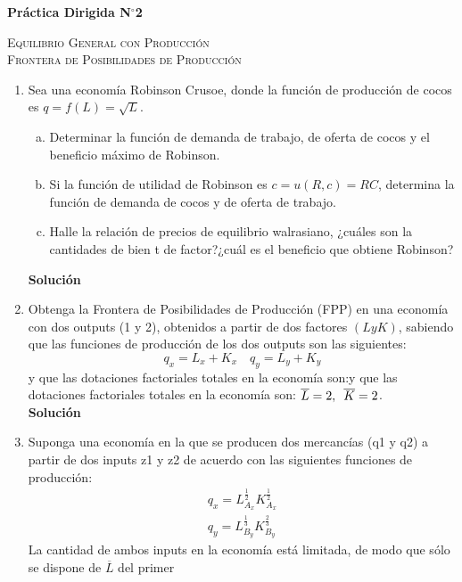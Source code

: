 \documentclass[10pt,a4paper]{article}
\begin{document}
	\begin{center}
		{\Large {\textbf{Práctica Dirigida N$^{\circ}$2}}}

		\textsc{Equilibrio General con Producción\\
				Frontera de Posibilidades de Producción}
		
	\end{center}
\begin{enumerate}
	\item Sea una economía Robinson Crusoe, donde la función de producción de cocos es $q=f(L)=\sqrt{L}$.
			\begin{enumerate}[a)]
				\item Determinar la función de demanda de trabajo, de oferta de cocos y el beneficio máximo de Robinson.
				\item Si la función de utilidad de Robinson es $c=u\left( R,c\right) =RC$, determina la función de demanda de cocos y de oferta de trabajo.
				\item Halle la relación de precios de equilibrio walrasiano, ¿cuáles son la cantidades de bien t de factor?¿cuál es el beneficio que obtiene Robinson?
			\end{enumerate}
			\textbf{\LARGE Solución}\\
				
	\item Obtenga la Frontera de Posibilidades de Producción (FPP) en una economía con dos outputs (1 y 2), obtenidos a partir de dos factores $(L y K)$, sabiendo que las funciones de producción de los dos outputs son las siguientes:
			$$q_x = L_x + K_x \quad q_y = L_y + K_y$$
	y que las dotaciones factoriales totales en la economía son:y que las dotaciones factoriales totales en la economía son:  $\overline{L}=2,\enskip \overline{K}=2$.\\[0.5cm]
		\textbf{\LARGE Solución}\\
			
	\item Suponga una economía en la que se producen dos mercancías (q1 y q2) a partir de dos inputs z1 y z2 de acuerdo
	con las siguientes funciones de producción:
			\begin{gather*}
				q_x = L_{A_x}^{\frac{1}{2}}K_{A_x}^{\frac{1}{2}}\\
				q_y = L_{B_y}^{\frac{1}{3}}K_{B_y}^{\frac{2}{3}}
			\end{gather*}	
	La cantidad de ambos inputs en la economía está limitada, de modo que sólo se dispone de $\overline{L}$ del primer

\end{enumerate}
\end{document}
